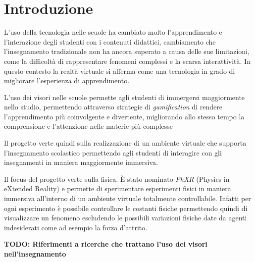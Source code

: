 \chapter{Introduzione}
\label{cha:introduzione}

L'uso della tecnologia nelle scuole ha cambiato molto l'apprendimento e l'interazione
degli studenti con i contenuti didattici, cambiamento che l'insegnamento tradizionale
non ha ancora superato a causa delle sue limitazioni, come la difficoltà di
rappresentare fenomeni complessi e la scarsa interattività. In questo contesto la
realtà virtuale si afferma come una tecnologia in grado di migliorare l'esperienza
di apprendimento.

L'uso dei visori nelle scuole permette agli studenti di immergersi maggiormente nello
studio, permettendo attraverso strategie di \textit{gamification} di rendere l'apprendimento
più coinvolgente e divertente, migliorando allo stesso tempo la comprensione e l'attenzione
nelle materie più complesse

Il progetto verte quindi sulla realizzazione di un ambiente virtuale che supporta
l'insegnamento scolastico permettendo agli studenti di interagire con gli insegnamenti
in maniera maggiormente immersiva.

Il focus del progetto verte sulla fisica. È stato nominato \textit{PhXR} (Physics
in eXtended Reality) e permette di sperimentare esperimenti fisici in maniera immersiva
all'interno di un ambiente virtuale totalmente controllabile. Infatti per ogni
esperimento è possibile controllare le costanti fisiche permettendo quindi di
visualizzare un fenomeno escludendo le possibili variazioni fisiche date da
agenti indesiderati come ad esempio la forza d'attrito.

\textbf{TODO: Riferimenti a ricerche che trattano l'uso dei visori nell'insegnamento}